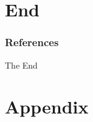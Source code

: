 \documentclass{beamer}
\begin{document}
\section{End}%

\begin{frame}
\frametitle{References}
\justifying




\end{frame}


\begin{frame}
\Huge{\centerline{The End}}
\end{frame}


\section{Appendix}%
\end{document}
